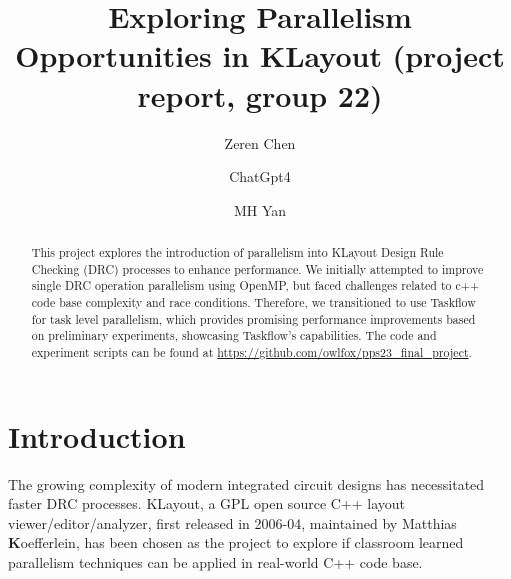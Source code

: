 \documentclass[sigconf]{acmart}
\begin{document}
\title{Exploring Parallelism Opportunities in KLayout (project report, group 22)}

\author{Zeren Chen}


\author{ChatGpt4}

\author{MH Yan }


\renewcommand{\shortauthors}{Zeren et al.}


  \begin{abstract}
  This project explores the introduction of parallelism into KLayout Design Rule Checking (DRC) processes to enhance performance. We initially attempted to improve single DRC operation parallelism using OpenMP, but faced challenges related to c++ code base complexity and race conditions. Therefore, we transitioned to use Taskflow for task level parallelism, which provides promising performance improvements based on preliminary experiments, showcasing Taskflow's capabilities. The code and experiment scripts can be found at \href{https://github.com/owlfox/pps23_final_project}{https://github.com/owlfox/pps23\_final\_project}.
  \end{abstract}
  
  
  \maketitle
  
  \section{Introduction}
  The growing complexity of modern integrated circuit designs has necessitated faster DRC processes. KLayout, a GPL open source C++ layout viewer/editor/analyzer, first released in 2006-04, maintained by Matthias \textbf{K}oefferlein, has been chosen as the project to explore if classroom learned parallelism techniques can be applied in real-world C++ code base.
  
\end{document}
